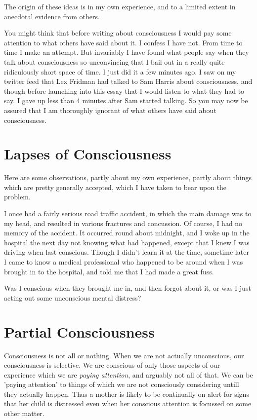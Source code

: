 \documentclass[10pt,titlepage]{article}
\begin{document}
The origin of these ideas is in my own experience, and to a limited extent in anecdotal evidence from others.

You might think that before writing about consciousness I would pay some attention to what others have said about it.
I confess I have not.
From time to time I make an attempt.
But invariably I have found what people say when they talk about consciousness so unconvincing that I bail out in a really quite ridiculously short space of time.
I just did it a few minutes ago.
I saw on my twitter feed that Lex Fridman had talked to Sam Harris about consciousness, and though before launching into this essay that I would listen to what they had to say.
I gave up less than 4 minutes after Sam started talking.
So you may now be assured that I am thoroughly ignorant of what others have said about consciousness.

\section{Lapses of Consciousness}

Here are some observations, partly about my own experience, partly about things which are pretty generally accepted, which I have taken to bear upon the problem.

I once had a fairly serious road traffic accident, in which the main damage was to my head, and resulted in various fractures and concussion.
Of course, I had no memory of the accident.
It occurred round about midnight, and I woke up in the hospital the next day not knowing what had happened, except that I knew I was driving when last conscious.
Though I didn't learn it at the time, sometime later I came to know a medical professional who happened to be around when I was brought in to the hospital, and told me that I had made a great fuss.

Was I conscious when they brought me in, and then forgot about it, or was I just acting out some unconscious mental distress?

\section{Partial Consciousness}

Consciousness is not all or nothing.
When we are not actually unconscious, our consciousness is selective.
We are conscious of only those aspects of our experience which we are \emph{paying attention}, and arguably not all of that.
We can be 'paying attention' to things of which we are not consciously considering untill they actually happen.
Thus a mother is likely to be continually on alert for signs that her child is distressed even when her conscious attention is focussed on some other matter.
\end{document}
